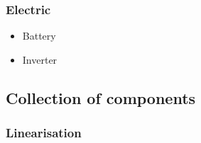 \subsubsection{Electric}

\begin{itemize}
	\item Battery
	\item Inverter
\end{itemize}

\subsection{Collection of components}

\subsubsection{Linearisation}